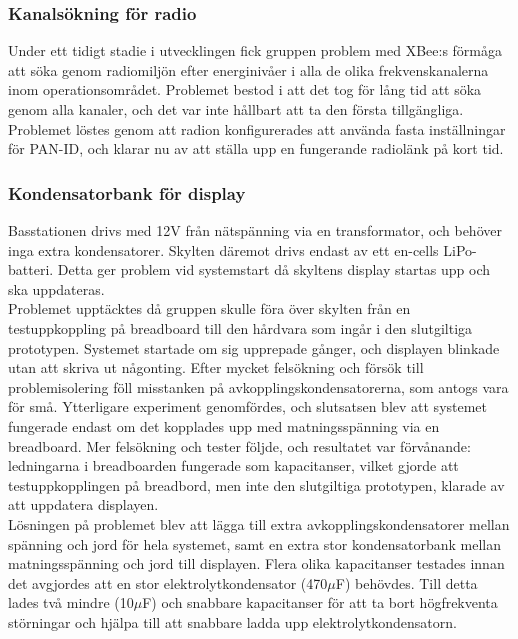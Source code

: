 \documentclass[a4paper,11pt]{article}
\begin{document}
\subsubsection{Kanalsökning för radio}
Under ett tidigt stadie i utvecklingen fick gruppen problem med XBee:s förmåga att söka genom radiomiljön efter energinivåer i alla de olika frekvenskanalerna inom operationsområdet. Problemet bestod i att det tog för lång tid att söka genom alla kanaler, och det var inte hållbart att ta den första tillgängliga. Problemet löstes genom att radion konfigurerades att använda fasta inställningar för PAN-ID, och klarar nu av att ställa upp en fungerande radiolänk på kort tid. 

\subsubsection{Kondensatorbank för display}
Basstationen drivs med 12V från nätspänning via en transformator, och behöver inga extra kondensatorer. Skylten däremot drivs endast av ett en-cells LiPo-batteri. Detta ger problem vid systemstart då skyltens display startas upp och ska uppdateras. \\

Problemet upptäcktes då gruppen skulle föra över skylten från en testuppkoppling på breadboard till den hårdvara som ingår i den slutgiltiga prototypen. Systemet startade om sig upprepade gånger, och displayen blinkade utan att skriva ut någonting. Efter mycket felsökning och försök till problemisolering föll misstanken på avkopplingskondensatorerna, som antogs vara för små. Ytterligare experiment genomfördes, och slutsatsen blev att systemet fungerade endast om det kopplades upp med matningsspänning via en breadboard. Mer felsökning och tester följde, och resultatet var förvånande: ledningarna i breadboarden fungerade som kapacitanser, vilket gjorde att testuppkopplingen på breadbord, men inte den slutgiltiga prototypen, klarade av att uppdatera displayen. \\

Lösningen på problemet blev att lägga till extra avkopplingskondensatorer mellan spänning och jord för hela systemet, samt en extra stor kondensatorbank mellan matningsspänning och jord till displayen. Flera olika kapacitanser testades innan det avgjordes att en stor elektrolytkondensator (470$\mu$F) behövdes. Till detta lades två mindre (10$\mu$F) och snabbare kapacitanser för att ta bort högfrekventa störningar och hjälpa till att snabbare ladda upp elektrolytkondensatorn. \\
\end{document}
